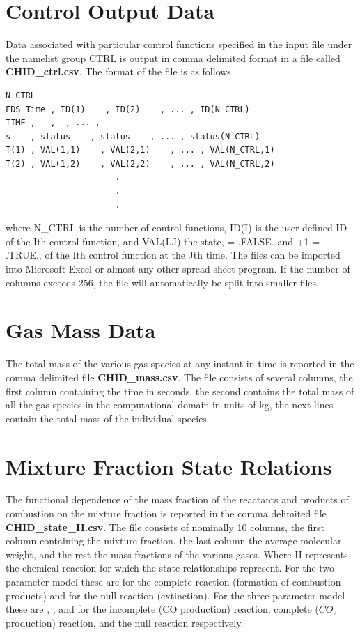 \documentclass[11pt]{book}
\begin{document}
\section{Control Output Data}
\label{out:CTRL}

Data associated with particular control functions specified in the input file under the
namelist group {\ct CTRL} is output in comma delimited format in a file called
{\bf CHID\_ctrl.csv}. The format of the file is as follows

\footnotesize
\begin{verbatim}
N_CTRL
FDS Time , ID(1)    , ID(2)    , ... , ID(N_CTRL)
TIME ,   ,  , ... ,
s    , status    , status    , ... , status(N_CTRL)
T(1) , VAL(1,1)    , VAL(2,1)    , ... , VAL(N_CTRL,1)
T(2) , VAL(1,2)    , VAL(2,2)    , ... , VAL(N_CTRL,2)
                      .
                      .
                      .
\end{verbatim}
\normalsize
where {\ct N\_CTRL} is the number of control functions, {\ct ID(I)} is the user-defined
ID of the {\ct I}th control function, and
{\ct VAL(I,J)} the state, { = .FALSE. and +1 = .TRUE.}, of the {\ct I}th control function at the {\ct J}th time.
The files can be imported into Microsoft Excel or almost any other
spread sheet program. If the number of columns exceeds 256, the file will automatically be split into smaller files.


\section{Gas Mass Data}

The total mass of the various gas species at any instant in time
is reported in the comma delimited
file {\bf CHID\_mass.csv}. The file consists of several columns,
the first column containing the time in seconds, the second contains the
total mass of all the gas species in the computational domain in units of kg,
the next lines contain the total mass of the individual species.

\section{Mixture Fraction State Relations}

The functional dependence of the mass fraction of the reactants and
products of combustion on the mixture fraction is
reported in the comma delimited
file {\bf CHID\_state\_II.csv}. The file consists of nominally 10 columns,
the first column containing the mixture fraction, the last column the average molecular weight, and
the rest the mass fractions of the various gases.  Where {\ct II} represents the chemical reaction for
which the state relationships represent.  For the two parameter model these are {}
for the complete reaction (formation of combustion products) and {} for the null reaction
(extinction).  For the three parameter model these are {}, {}, and {} for the
incomplete (CO production) reaction, complete ($CO_2$ production) reaction, and the null
reaction respectively.
\end{document}
